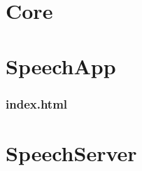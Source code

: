 \part{Core}
	\setcounter{chapter}{0}
	
	
	
	
	
	
\part{SpeechApp}
	\setcounter{chapter}{0}
	
	\section{index.html}
	
	
\part{SpeechServer}
	\setcounter{chapter}{0}
	
